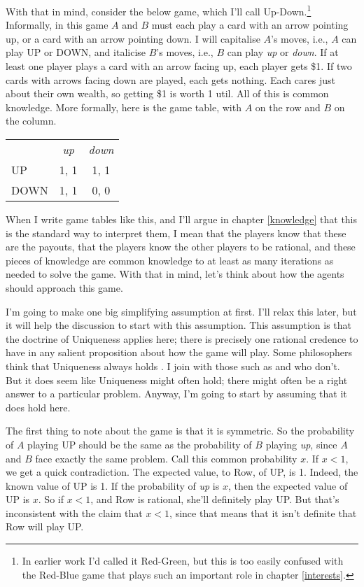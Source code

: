 \documentclass[11pt,]{book}
\let\rmarkdownfootnote\footnote%
\def\footnote{\protect\rmarkdownfootnote}
\def\toprule{}
\def\bottomrule{}
\begin{document}
With that in mind, consider the below game, which I'll call Up-Down.\footnote{In earlier work I'd called it Red-Green, but this is too easily confused with the Red-Blue game that plays such an important role in chapter \ref{interests}.} Informally, in this game \(A\) and \(B\) must each play a card with an arrow pointing up, or a card with an arrow pointing down. I will capitalise \(A\)'s moves, i.e., \(A\) can play UP or DOWN, and italicise \(B\)'s moves, i.e., \(B\) can play \emph{up} or \emph{down}. If at least one player plays a card with an arrow facing up, each player gets \$1. If two cards with arrows facing down are played, each gets nothing. Each cares just about their own wealth, so getting \$1 is worth 1 util. All of this is common knowledge. More formally, here is the game table, with \(A\) on the row and \(B\) on the column.

\begin{longtable}[]{@{}lcc@{}}
\toprule
\endhead
& \emph{up} & \emph{down}\tabularnewline
UP & 1, 1 & 1, 1\tabularnewline
DOWN & 1, 1 & 0, 0\tabularnewline
\bottomrule
\end{longtable}

When I write game tables like this, and I'll argue in chapter \ref{knowledge} that this is the standard way to interpret them, I mean that the players know that these are the payouts, that the players know the other players to be rational, and these pieces of knowledge are common knowledge to at least as many iterations as needed to solve the game. With that in mind, let's think about how the agents should approach this game.

I'm going to make one big simplifying assumption at first. I'll relax this later, but it will help the discussion to start with this assumption. This assumption is that the doctrine of Uniqueness applies here; there is precisely one rational credence to have in any salient proposition about how the game will play. Some philosophers think that Uniqueness always holds \citep{White2005-WHIEP}. I join with those such as \citet{North2010} and \citet{Schoenfield2013} who don't. But it does seem like Uniqueness might often hold; there might often be a right answer to a particular problem. Anyway, I'm going to start by assuming that it does hold here.

The first thing to note about the game is that it is symmetric. So the probability of \(A\) playing UP should be the same as the probability of \(B\) playing \emph{up}, since \(A\) and \(B\) face exactly the same problem. Call this common probability \(x\). If \(x < 1\), we get a quick contradiction. The expected value, to Row, of UP, is 1. Indeed, the known value of UP is 1. If the probability of \emph{up} is \(x\), then the expected value of UP is \(x\). So if \(x < 1\), and Row is rational, she'll definitely play UP. But that's inconsistent with the claim that \(x < 1\), since that means that it isn't definite that Row will play UP.
\end{document}
